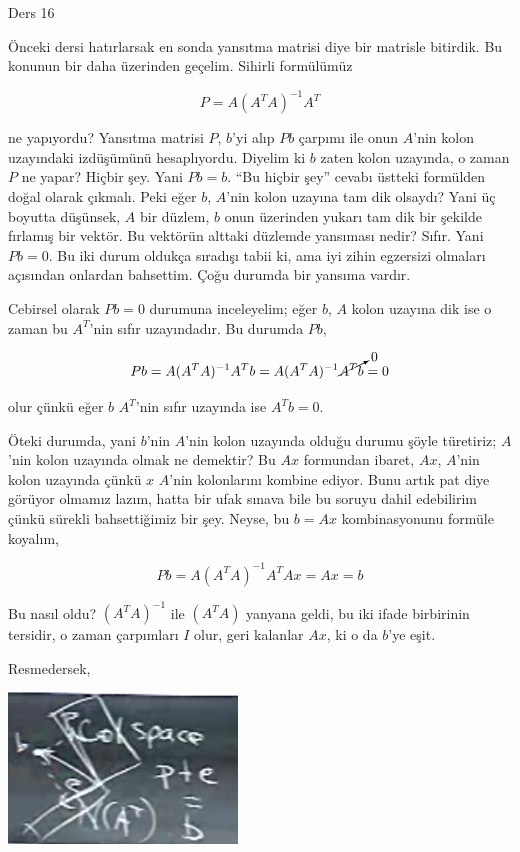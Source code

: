\documentclass[12pt,fleqn]{article}\usepackage{../../common}
\begin{document}
Ders 16

Önceki dersi hatırlarsak en sonda yansıtma matrisi diye bir matrisle
bitirdik. Bu konunun bir daha üzerinden geçelim. Sihirli formülümüz 

$$ P = A(A^TA)^{-1}A^T $$

ne yapıyordu? Yansıtma matrisi $P$, $b$'yi alıp $Pb$ çarpımı ile onun
$A$'nin kolon uzayındaki izdüşümünü hesaplıyordu. Diyelim ki $b$ zaten
kolon uzayında, o zaman $P$ ne yapar? Hiçbir şey. Yani $Pb=b$. ``Bu hiçbir
şey'' cevabı üstteki formülden doğal olarak çıkmalı. Peki eğer $b$, $A$'nin
kolon uzayına tam dik olsaydı? Yani üç boyutta düşünsek, $A$ bir düzlem,
$b$ onun üzerinden yukarı tam dik bir şekilde fırlamış bir vektör. Bu
vektörün alttaki düzlemde yansıması nedir?  Sıfır. Yani $Pb=0$. Bu iki
durum oldukça sıradışı tabii ki, ama iyi zihin egzersizi olmaları açısından
onlardan bahsettim. Çoğu durumda bir yansıma vardır.

Cebirsel olarak $Pb=0$ durumuna inceleyelim; eğer $b$, $A$ kolon uzayına
dik ise o zaman bu $A^T$'nin sıfır uzayındadır. Bu durumda $Pb$, 

$$ Pb =  A(A^TA)^{-1}A^T b =A(A^TA)^{-1}\cancelto{0}{A^T b} = 0  $$

olur çünkü eğer $b$ $A^T$'nin sıfır uzayında ise $A^Tb=0$. 

Öteki durumda, yani $b$'nin $A$'nin kolon uzayında olduğu durumu şöyle
türetiriz; $A$'nin kolon uzayında olmak ne demektir? Bu $Ax$ formundan
ibaret, $Ax$, $A$'nin kolon uzayında çünkü $x$ $A$'nin kolonlarını kombine
ediyor. Bunu artık pat diye görüyor olmamız lazım, hatta bir ufak sınava
bile bu soruyu dahil edebilirim çünkü sürekli bahsettiğimiz bir şey. Neyse,
bu $b=Ax$ kombinasyonunu formüle koyalım,

$$ Pb =  A(A^TA)^{-1}A^TAx = Ax = b$$

Bu nasıl oldu? $(A^TA)^{-1}$ ile $(A^TA)$ yanyana geldi, bu iki ifade birbirinin
tersidir, o zaman çarpımları $I$ olur, geri kalanlar $Ax$, ki o da $b$'ye eşit. 

Resmedersek, 

\includegraphics[height=4cm]{16_6.png}
\end{document}

